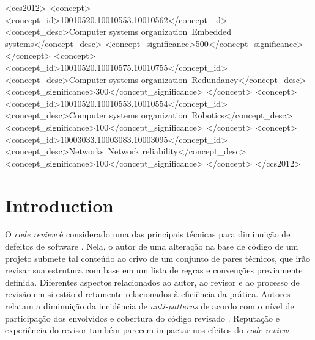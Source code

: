 \documentclass[sigconf]{acmart}
\begin{document}
%
%
\begin{CCSXML}
<ccs2012>
 <concept>
  <concept_id>10010520.10010553.10010562</concept_id>
  <concept_desc>Computer systems organization~Embedded systems</concept_desc>
  <concept_significance>500</concept_significance>
 </concept>
 <concept>
  <concept_id>10010520.10010575.10010755</concept_id>
  <concept_desc>Computer systems organization~Redundancy</concept_desc>
  <concept_significance>300</concept_significance>
 </concept>
 <concept>
  <concept_id>10010520.10010553.10010554</concept_id>
  <concept_desc>Computer systems organization~Robotics</concept_desc>
  <concept_significance>100</concept_significance>
 </concept>
 <concept>
  <concept_id>10003033.10003083.10003095</concept_id>
  <concept_desc>Networks~Network reliability</concept_desc>
  <concept_significance>100</concept_significance>
 </concept>
</ccs2012>
\end{CCSXML}





\maketitle

\section{Introduction}

O \textit{code review} é considerado uma das principais técnicas para diminuição de defeitos de software \cite{Boehm2001}. Nela, o autor de uma alteração na base de código de um projeto submete tal conteúdo ao crivo de um conjunto de pares técnicos, que irão revisar sua estrutura com base em um lista de regras e convenções previamente definida. Diferentes aspectos relacionados ao autor, ao revisor e ao processo de revisão em si estão diretamente relacionados à eficiência da prática. Autores relatam a diminuição da incidência de \textit{anti-patterns} \cite{Kemerer2009} de acordo com o nível de participação dos envolvidos e cobertura do código revisado \cite{Meneely201437, Morales2015171, Bavota201581}. Reputação \cite{Baysal2013122, Bosu2014} e experiência \cite{Kononenko2015111} do revisor também parecem impactar nos efeitos do \textit{code review}
\end{document}
